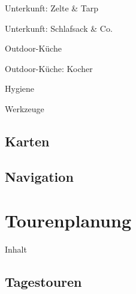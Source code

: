 \documentclass{beamer}
\begin{document}
			\begin{frame}{Unterkunft: Zelte \& Tarp}
			\end{frame}
			
			\begin{frame}{Unterkunft: Schlafsack \& Co.}
			\end{frame}
			
			\begin{frame}{Outdoor-Küche}
			\end{frame}
			
			\begin{frame}{Outdoor-Küche: Kocher}
			\end{frame}
			
			\begin{frame}{Hygiene}
			\end{frame}
			
			\begin{frame}{Werkzeuge}
			\end{frame}
		
		\subsection{Karten}
			
			\begin{frame}{}
			\end{frame}
		
		\subsection{Navigation}
			
			\begin{frame}{}
			\end{frame}
	
	\section{Tourenplanung}
		
		\begin{frame}[t]{Inhalt}
		\end{frame}
	
		\subsection{Tagestouren}
			
			\begin{frame}{}
			\end{frame}
			
\end{document}
